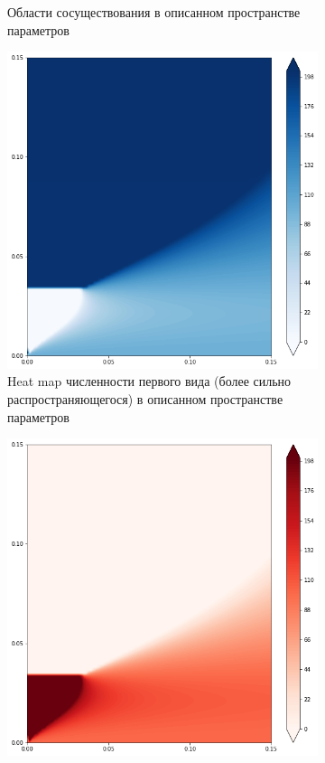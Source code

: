 \begin{figure}[ht]
\begin{subfigure}{.5\textwidth}
		\caption{Области сосуществования в описанном пространстве параметров}
		\label{fig:hmd3:sub2}
	\end{subfigure}
	\begin{subfigure}{.5\textwidth}
	\centering
	\includegraphics[width=.93\linewidth]{hm_d3_n1.png}
	\caption{Heat map численности первого вида (более сильно распространяющегося) в описанном пространстве параметров}
	\label{fig:hmd3:sub3}
\end{subfigure}%
\begin{subfigure}{.5\textwidth}
	\centering
	\includegraphics[width=.93\linewidth]{hm_d3_n2.png}

\end{subfigure}
\end{figure}
